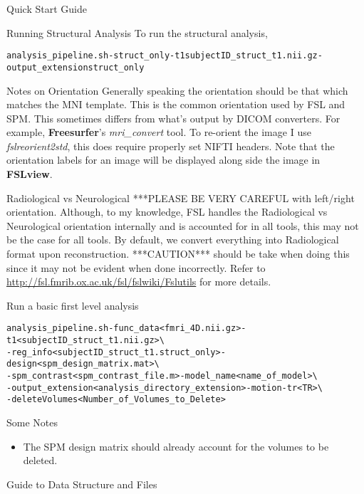 \documentclass[]{report}
\begin{document}
\begin{chapter}{Quick Start Guide }
\begin{section}{Running Structural Analysis}
To run the structural analysis, 
\begin{alltt}
analysis_pipeline.sh -struct_only -t1 subjectID\_struct\_t1.nii.gz  -output\_extension struct\_only
\end{alltt}


\begin{subsection}{Notes on Orientation}
Generally speaking the orientation should be that which matches the MNI template. This is the common orientation used by FSL and SPM.  This sometimes differs from what's output by DICOM converters. For example, {\bf Freesurfer}'s {\it mri\_convert} tool. To re-orient the image I use  {\it fslreorient2std}, this does require properly set NIFTI headers. Note that the orientation labels for an image will be displayed along side the image in {\bf FSLview}.
\begin{subsubsection}{Radiological vs Neurological}
***PLEASE BE VERY CAREFUL with left/right orientation. Although, to my knowledge, FSL handles the Radiological vs Neurological orientation internally and is accounted for in all tools, this may not be the case for all tools.  By default, we convert everything into Radiological format upon reconstruction. ***CAUTION***  should be take when doing this since it may not be evident when done incorrectly. Refer to \url{http://fsl.fmrib.ox.ac.uk/fsl/fslwiki/Fslutils} for more details. 

\end{subsubsection}


\end{subsection}

\end{section}

\begin{section}{Run a basic first level analysis}
\
\begin{alltt}
analysis\_pipeline.sh  -func\_data <fmri\_4D.nii.gz>   -t1 <subjectID\_struct\_t1.nii.gz>  \textbackslash \\
\hspace*{0.5in} -reg\_info <subjectID\_struct\_t1.struct\_only> -design <spm\_design\_matrix.mat> \textbackslash  \\
\hspace*{0.5in} -spm\_contrast  <spm\_contrast\_file.m> -model\_name <name\_of\_model> \textbackslash   \\
\hspace*{0.5in} -output\_extension <analysis\_directory\_extension>  -motion -tr <TR> \textbackslash  \\
\hspace*{0.5in} -deleteVolumes <Number\_of\_Volumes\_to\_Delete>
\end{alltt}
{Some Notes}
\begin{itemize}
	\item  The SPM design matrix should already account for the volumes to be deleted.
\end{itemize}

\end{section}

\end{chapter}

\begin{chapter}{Guide to Data Structure and Files}

\end{chapter}
\end{document}
